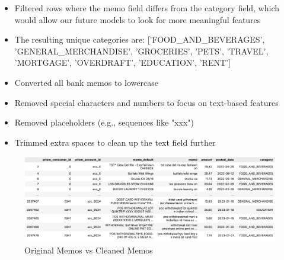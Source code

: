 \documentclass[12pt,letterpaper]{article}
\begin{document}
\begin{itemize}
    \item Filtered rows where the memo field differs from the category field, which would allow our future models to look for more meaningful features 
    \item The resulting unique categories are: ['FOOD\_AND\_BEVERAGES', 'GENERAL\_MERCHANDISE', 'GROCERIES', 'PETS', 'TRAVEL', 'MORTGAGE', 'OVERDRAFT', 'EDUCATION', 'RENT']
    \item Converted all bank memos to lowercase
    \item Removed special characters and numbers to focus on text-based features
    \item Removed placeholders (e.g., sequences like "xxx")
    \item Trimmed extra spaces to clean up the text field further
\end{itemize}
\begin{figure}[H]
    \centering
    \includegraphics[width=1.0\textwidth]{figure/memo_clean.png}
    \caption{Original Memos vs Cleaned Memos}
    \label{fig:enter-label}
\end{figure}
\end{document}
